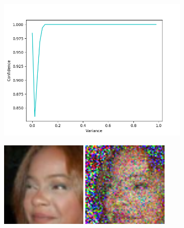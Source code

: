 \begin{figure}[h]
	\begin{subfigure}[b]{0.5\textwidth}
		\includegraphics[width=\textwidth]{figures/diversity_gan2_real_dis_real_imgs_plot}
	\end{subfigure}
	\begin{subfigure}[b]{0.5\textwidth}
		\centering
		\includegraphics[width=0.45\textwidth]{figures/diversity_gan2_real_dis_real_imgs_var0}
		\includegraphics[width=0.45\textwidth]{figures/diversity_gan2_real_dis_real_imgs_var30}

\end{subfigure}
\end{figure}
